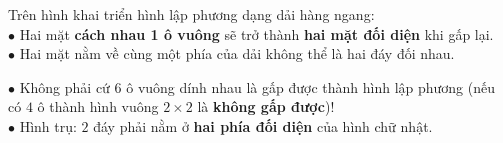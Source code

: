\documentclass[14pt,a4paper,oneside]{extbook}
\begin{document}
\vspace{3mm}

\noindent
\begin{minipage}[t]{0.54\textwidth}
  \begin{tcolorbox}[
    enhanced,
    title={\footnotesize\bfseries\color{white}\faArrowsAltH\ Mẹo tìm hai mặt đối diện},
    colback=green!3!white,
    colframe=green!60!black,
    arc=2.5mm, boxrule=0.8pt, top=1.8mm, bottom=1.8mm, left=2.2mm, right=2.2mm
  ]
    \footnotesize
    Trên hình khai triển hình lập phương dạng dải hàng ngang:\\
    $\bullet$ Hai mặt \textbf{cách nhau 1 ô vuông} sẽ trở thành \textbf{hai mặt đối diện} khi gấp lại.\\
    $\bullet$ Hai mặt nằm về cùng một phía của dải không thể là hai đáy đối nhau.
  \end{tcolorbox}
\end{minipage}%
\hfill
\begin{minipage}[t]{0.44\textwidth}
  \begin{tcolorbox}[
    enhanced,
    title={\footnotesize\bfseries\color{white}\faExclamationTriangle\ Mẹo tránh bẫy trắc nghiệm},
    colback=red!2!white,
    colframe=red!70!black,
    arc=2.5mm, boxrule=0.8pt, top=1.8mm, bottom=1.8mm, left=2.2mm, right=2.2mm
  ]
    \footnotesize
    $\bullet$ Không phải cứ $6$ ô vuông dính nhau là gấp được thành hình lập phương (nếu có $4$ ô thành hình vuông $2 \times 2$ là \textbf{không gấp được})!\\
    $\bullet$ Hình trụ: $2$ đáy phải nằm ở \textbf{hai phía đối diện} của hình chữ nhật.
  \end{tcolorbox}
\end{minipage}
\end{document}
